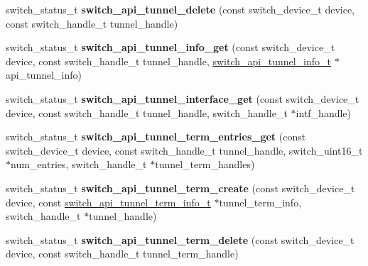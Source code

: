\begin{DoxyCompactItemize}
\item 
\hypertarget{group__Tunnel_ga04860a058be2ec6cdea0ed3a20fbf7ef}{switch\+\_\+status\+\_\+t {\bfseries switch\+\_\+api\+\_\+tunnel\+\_\+delete} (const switch\+\_\+device\+\_\+t device, const switch\+\_\+handle\+\_\+t tunnel\+\_\+handle)}\label{group__Tunnel_ga04860a058be2ec6cdea0ed3a20fbf7ef}

\item 
\hypertarget{group__Tunnel_ga2a26589f76ff8cb525ea2b81a66f6be8}{switch\+\_\+status\+\_\+t {\bfseries switch\+\_\+api\+\_\+tunnel\+\_\+info\+\_\+get} (const switch\+\_\+device\+\_\+t device, const switch\+\_\+handle\+\_\+t tunnel\+\_\+handle, \hyperlink{group__Tunnel_ga9c4faabdbd4426a0e9903279ad118116}{switch\+\_\+api\+\_\+tunnel\+\_\+info\+\_\+t} $\ast$api\+\_\+tunnel\+\_\+info)}\label{group__Tunnel_ga2a26589f76ff8cb525ea2b81a66f6be8}

\item 
\hypertarget{group__Tunnel_ga4aadce36eca4cf958191287a59942159}{switch\+\_\+status\+\_\+t {\bfseries switch\+\_\+api\+\_\+tunnel\+\_\+interface\+\_\+get} (const switch\+\_\+device\+\_\+t device, const switch\+\_\+handle\+\_\+t tunnel\+\_\+handle, switch\+\_\+handle\+\_\+t $\ast$intf\+\_\+handle)}\label{group__Tunnel_ga4aadce36eca4cf958191287a59942159}

\item 
\hypertarget{group__Tunnel_ga0bac0044a3768324d9825eb9d16e98a3}{switch\+\_\+status\+\_\+t {\bfseries switch\+\_\+api\+\_\+tunnel\+\_\+term\+\_\+entries\+\_\+get} (const switch\+\_\+device\+\_\+t device, const switch\+\_\+handle\+\_\+t tunnel\+\_\+handle, switch\+\_\+uint16\+\_\+t $\ast$num\+\_\+entries, switch\+\_\+handle\+\_\+t $\ast$tunnel\+\_\+term\+\_\+handles)}\label{group__Tunnel_ga0bac0044a3768324d9825eb9d16e98a3}

\item 
\hypertarget{group__Tunnel_ga2bede1a41f48ff194408ece3456d1b7f}{switch\+\_\+status\+\_\+t {\bfseries switch\+\_\+api\+\_\+tunnel\+\_\+term\+\_\+create} (const switch\+\_\+device\+\_\+t device, const \hyperlink{structswitch__api__tunnel__term__info__s}{switch\+\_\+api\+\_\+tunnel\+\_\+term\+\_\+info\+\_\+t} $\ast$tunnel\+\_\+term\+\_\+info, switch\+\_\+handle\+\_\+t $\ast$tunnel\+\_\+handle)}\label{group__Tunnel_ga2bede1a41f48ff194408ece3456d1b7f}

\item 
\hypertarget{group__Tunnel_gad585582fb7158e73f56f8970911d1ebc}{switch\+\_\+status\+\_\+t {\bfseries switch\+\_\+api\+\_\+tunnel\+\_\+term\+\_\+delete} (const switch\+\_\+device\+\_\+t device, const switch\+\_\+handle\+\_\+t tunnel\+\_\+term\+\_\+handle)}\label{group__Tunnel_gad585582fb7158e73f56f8970911d1ebc}


\end{DoxyCompactItemize}
